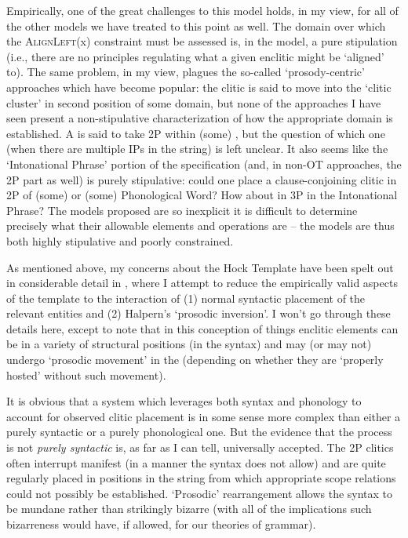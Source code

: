 \documentclass[output=paper,
modfonts
]{LSP/langsci}
\begin{document}
Empirically, one of the great challenges to this model holds, in my view, for all of the
other models we have treated to this point as well. The domain over which the \textsc{AlignLeft}(x) constraint
must be assessed is, in the model, a pure stipulation (i.e., there are no principles regulating what
a given enclitic might be `aligned' to). 
The same problem, in my view, plagues the so-called `prosody-centric' approaches which have
become popular: the clitic is said to move into the `clitic cluster' in second position of some domain,
but none of the approaches I have seen \citep{keydana2011,lowe2014,goldstein2016} present a non-stipulative characterization
of how the appropriate domain is established. A  is said to take 2P within (some) ,
but the question of which one (when there are multiple IPs in the string) is left unclear. It also seems like the `Intonational Phrase' portion of
the specification (and, in non-OT approaches, the 2P part as well) is purely stipulative: could one place a clause-conjoining
clitic in 2P of (some)  or (some) Phonological Word? How about in 3P in the Intonational
Phrase? The models proposed are so inexplicit it is difficult to determine precisely what their allowable
elements and operations are -- the models are thus both highly stipulative and poorly constrained.

As mentioned above, my concerns about the Hock Template have been spelt out in considerable detail in \citet{hale1996},
where I attempt to reduce the empirically valid aspects of the template to the interaction of (1) normal
syntactic placement of the relevant entities and (2) Halpern's \citeyearpar{halpern1995} `prosodic inversion'. I won't go
through these details here, except to note that in this conception of things enclitic elements can be in a variety of structural positions (in the syntax) and may
(or may not) undergo `prosodic movement' in the  (depending on whether they are `properly hosted'
without such movement).

It is obvious that a system which leverages both syntax and phonology to account for
observed clitic placement is in some sense more complex than either a purely syntactic or a purely
phonological one.  But the evidence that the process is not \textit{purely syntactic} is, as far as I
can tell, universally accepted. The 2P clitics often interrupt manifest  (in
a manner the syntax does not allow) and are quite regularly placed in positions in the string from
which appropriate scope relations could not possibly be established. `Prosodic' rearrangement
allows the syntax to be mundane rather than strikingly bizarre (with all of the implications 
such bizarreness would have, if allowed, for our theories of grammar).
\end{document}

